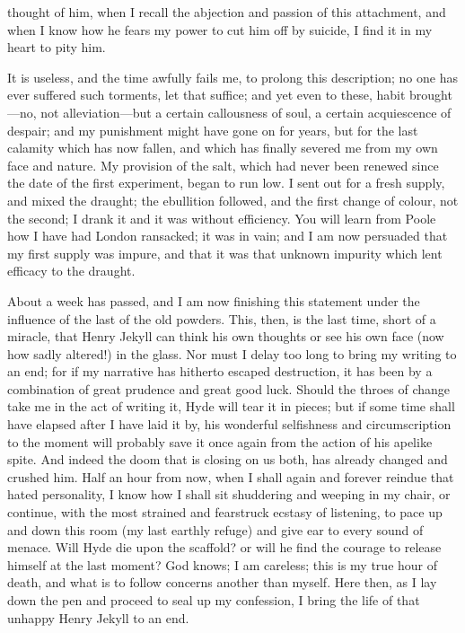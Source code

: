 \documentclass[]{novel}
\begin{document}
thought of him, when I recall the abjection and passion of this attachment, and when I know how he fears my power to cut him off by suicide, I find it in my heart to pity him.

It is useless, and the time awfully fails me, to prolong this description; no one has ever suffered such torments, let that suffice; and yet even to these, habit brought—no, not alleviation—but a certain callousness of soul, a certain acquiescence of despair; and my punishment might have gone on for years, but for the last calamity which has now fallen, and which has finally severed me from my own face and nature. My provision of the salt, which had never been renewed since the date of the first experiment, began to run low. I sent out for a fresh supply, and mixed the draught; the ebullition followed, and the first change of colour, not the second; I drank it and it was without efficiency. You will learn from Poole how I have had London ransacked; it was in vain; and I am now persuaded that my first supply was impure, and that it was that unknown impurity which lent efficacy to the draught.

About a week has passed, and I am now finishing this statement under the influence of the last of the old powders. This, then, is the last time, short of a miracle, that Henry Jekyll can think his own thoughts or see his own face (now how sadly altered!) in the glass. Nor must I delay too long to bring my writing to an end; for if my narrative has hitherto escaped destruction, it has been by a combination of great prudence and great good luck. Should the throes of change take me in the act of writing it, Hyde will tear it in pieces; but if some time shall have elapsed after I have laid it by, his wonderful selfishness and circumscription to the moment will probably save it once again from the action of his apelike spite. And indeed the doom that is closing on us both, has already changed and crushed him. Half an hour from now, when I shall again and forever reindue that hated personality, I know how I shall sit shuddering and weeping in my chair, or continue, with the most strained and fearstruck ecstasy of listening, to pace up and down this room (my last earthly refuge) and give ear to every sound of menace. Will Hyde die upon the scaffold? or will he find the courage to release himself at the last moment? God knows; I am careless; this is my true hour of death, and what is to follow concerns another than myself. Here then, as I lay down the pen and proceed to seal up my confession, I bring the life of that unhappy Henry Jekyll to an end.
\end{document}
